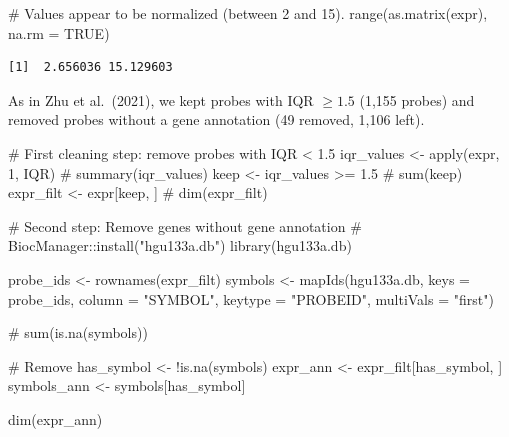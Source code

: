 \documentclass[
  letterpaper,
  DIV=11,
  numbers=noendperiod]{scrartcl}
\newenvironment{Shaded}{\begin{snugshade}}{\end{snugshade}}
\newcommand{\AttributeTok}[1]{\textcolor[rgb]{0.40,0.45,0.13}{#1}}
\newcommand{\CommentTok}[1]{\textcolor[rgb]{0.37,0.37,0.37}{#1}}
\newcommand{\ConstantTok}[1]{\textcolor[rgb]{0.56,0.35,0.01}{#1}}
\newcommand{\DecValTok}[1]{\textcolor[rgb]{0.68,0.00,0.00}{#1}}
\newcommand{\FloatTok}[1]{\textcolor[rgb]{0.68,0.00,0.00}{#1}}
\newcommand{\FunctionTok}[1]{\textcolor[rgb]{0.28,0.35,0.67}{#1}}
\newcommand{\NormalTok}[1]{\textcolor[rgb]{0.00,0.23,0.31}{#1}}
\newcommand{\OtherTok}[1]{\textcolor[rgb]{0.00,0.23,0.31}{#1}}
\newcommand{\SpecialCharTok}[1]{\textcolor[rgb]{0.37,0.37,0.37}{#1}}
\newcommand{\StringTok}[1]{\textcolor[rgb]{0.13,0.47,0.30}{#1}}
\begin{document}
\begin{Shaded}
\begin{Highlighting}[]
\CommentTok{\# Values appear to be normalized (between 2 and 15).}
\FunctionTok{range}\NormalTok{(}\FunctionTok{as.matrix}\NormalTok{(expr), }\AttributeTok{na.rm =} \ConstantTok{TRUE}\NormalTok{)}
\end{Highlighting}
\end{Shaded}

\begin{verbatim}
[1]  2.656036 15.129603
\end{verbatim}

As in Zhu et al.~(2021), we kept probes with IQR \(\geq 1.5\) (1,155
probes) and removed probes without a gene annotation (49 removed, 1,106
left).

\begin{Shaded}
\begin{Highlighting}[]
\CommentTok{\# First cleaning step: remove probes with IQR \textless{} 1.5}
\NormalTok{iqr\_values }\OtherTok{\textless{}{-}} \FunctionTok{apply}\NormalTok{(expr, }\DecValTok{1}\NormalTok{, IQR)}
\CommentTok{\# summary(iqr\_values)}
\NormalTok{keep }\OtherTok{\textless{}{-}}\NormalTok{ iqr\_values }\SpecialCharTok{\textgreater{}=} \FloatTok{1.5}
\CommentTok{\# sum(keep)}
\NormalTok{expr\_filt }\OtherTok{\textless{}{-}}\NormalTok{ expr[keep, ]}
\CommentTok{\# dim(expr\_filt)}

\CommentTok{\# Second step: Remove genes without gene annotation}
\CommentTok{\# BiocManager::install("hgu133a.db")}
\FunctionTok{library}\NormalTok{(hgu133a.db)}

\NormalTok{probe\_ids }\OtherTok{\textless{}{-}} \FunctionTok{rownames}\NormalTok{(expr\_filt)}
\NormalTok{symbols }\OtherTok{\textless{}{-}} \FunctionTok{mapIds}\NormalTok{(hgu133a.db,}
                  \AttributeTok{keys =}\NormalTok{ probe\_ids,}
                  \AttributeTok{column =} \StringTok{"SYMBOL"}\NormalTok{,}
                  \AttributeTok{keytype =} \StringTok{"PROBEID"}\NormalTok{,}
                  \AttributeTok{multiVals =} \StringTok{"first"}\NormalTok{)}

\CommentTok{\# sum(is.na(symbols))}

\CommentTok{\# Remove}
\NormalTok{has\_symbol }\OtherTok{\textless{}{-}} \SpecialCharTok{!}\FunctionTok{is.na}\NormalTok{(symbols)}
\NormalTok{expr\_ann }\OtherTok{\textless{}{-}}\NormalTok{ expr\_filt[has\_symbol, ]}
\NormalTok{symbols\_ann }\OtherTok{\textless{}{-}}\NormalTok{ symbols[has\_symbol]}

\FunctionTok{dim}\NormalTok{(expr\_ann)}
\end{Highlighting}
\end{Shaded}
\end{document}
